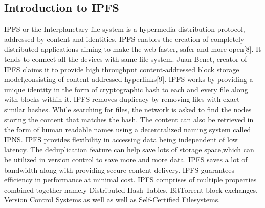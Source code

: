 \documentclass[12pt]{article}
\begin{document}
\subsection{Introduction to IPFS}
IPFS or the Interplanetary file system is a hypermedia distribution protocol, addressed by content and identities. IPFS enables the creation of completely distributed applications aiming to make the web faster, safer and more open[8]. It tends to connect all the devices with same file system. Juan Benet, creator of IPFS claims it to provide high throughput content-addressed block storage model,consisting of content-addressed hyperlinks[9]. IPFS works by providing a unique identity in the form of cryptographic hash to each and every file along with blocks within it. IPFS removes duplicacy by removing files with exact similar hashes. While searching for files, the network is asked to find the nodes storing the content that matches the hash. The content can also be retrieved in the form of human readable names using a decentralized naming system called IPNS. IPFS provides flexibility in  accessing data being independent of low latency. The deduplication feature can help save lots of storage space,which can be utilized in version control to save more and more data. IPFS saves a lot of bandwidth along with providing secure content delivery.  IPFS  guarantees efficiency in performance at minimal cost.   IPFS comprises of multiple properties combined together namely Distributed Hash Tables, BitTorrent block exchanges, Version Control Systems as well as well as Self-Certified Filesystems. 
\end{document}
